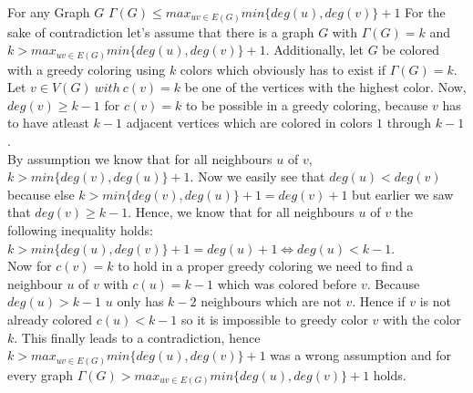 \documentclass[a4paper]{article}
\begin{document}
\begin{solution}{29}
		
		\begin{theorem}{For any Graph $G$  $\Gamma(G) \leq max_{uv \in E(G)} min\{deg(u), deg(v)\} + 1$}
		For the sake of contradiction let's assume that there is a graph $G$ with $\Gamma(G) = k$ and $k > max_{uv \in E(G)} min\{deg(u), deg(v)\} + 1$. 
		Additionally, let $G$ be colored with a greedy coloring using $k$ colors which obviously has to exist if $\Gamma(G) = k$. \\
		Let $v \in V(G)\ with\ c(v) = k$ be one of the vertices with the highest color. 
		Now, $deg(v) \geq k-1$  for $c(v)=k$ to be possible in a greedy coloring, because $v$ has to have atleast $k-1$ adjacent vertices which are colored in colors $1$ through $k-1$. \\
		By assumption we know that for all neighbours $u$ of $v$, $k> min\{deg(v), deg(u)\} + 1$. 
		Now we easily see that $deg(u) < deg(v)$ because else  $k > min\{deg(v), deg(u)\} + 1 = deg(v) + 1$ but earlier we saw that $deg(v) \geq k-1$. 
		Hence, we know that for all neighbours $u$ of $v$ the following inequality holds: $k > min\{deg(u), deg(v)\} + 1 = deg(u) + 1 \Leftrightarrow deg(u) < k - 1$. \\
		Now for $c(v)=k$ to hold in a proper greedy coloring we need to find a neighbour $u$ of $v$ with $c(u)=k-1$ which was colored before $v$. 
		Because $deg(u) > k-1$ $u$ only has $k-2$ neighbours which are not $v$. 
		Hence if $v$ is not already colored $c(u) < k-1$ so it is impossible to greedy color $v$ with the color $k$. 
		This finally leads to a contradiction, hence $k > max_{uv \in E(G)} min\{deg(u), deg(v)\} + 1$ was a wrong assumption and for every graph $\Gamma(G) > max_{uv \in E(G)} min\{deg(u), deg(v)\} + 1$ holds.
		\end{theorem}
	\end{solution}
	\newpage
\end{document}
